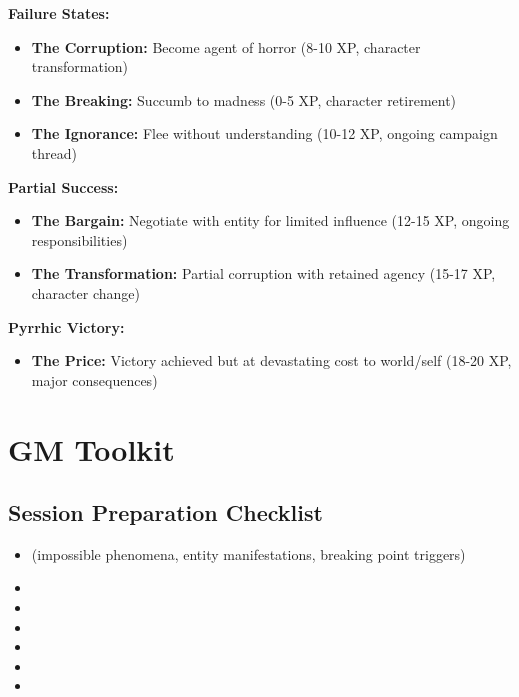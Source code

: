 \documentclass[11pt]{article}
\begin{document}
\textbf{Failure States:}
\begin{itemize}
\item \textbf{The Corruption:} Become agent of horror (8-10 XP, character transformation)
\item \textbf{The Breaking:} Succumb to madness (0-5 XP, character retirement)
\item \textbf{The Ignorance:} Flee without understanding (10-12 XP, ongoing campaign thread)
\end{itemize}

\textbf{Partial Success:}
\begin{itemize}
\item \textbf{The Bargain:} Negotiate with entity for limited influence (12-15 XP, ongoing responsibilities)
\item \textbf{The Transformation:} Partial corruption with retained agency (15-17 XP, character change)
\end{itemize}

\textbf{Pyrrhic Victory:}
\begin{itemize}
\item \textbf{The Price:} Victory achieved but at devastating cost to world/self (18-20 XP, major consequences)
\end{itemize}

\section{GM Toolkit}

\subsection{Session Preparation Checklist}

\begin{itemize}
\item {} (impossible phenomena, entity manifestations, breaking point triggers)
\item {}
\item {}
\item {}
\item {}
\item {}
\item {}
\end{itemize}
\end{document}
